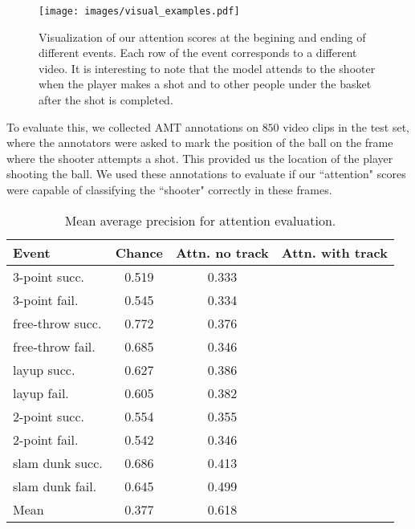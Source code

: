 

\begin{figure*}[t!]
\begin{center}
   \texttt{[image: images/visual\_examples.pdf]}
\end{center}
   \caption{Visualization of our attention scores at the begining and ending of different events.
Each row of the event corresponds to a different video. It is interesting to note that the model
attends to the shooter when the player makes a shot and to other people under the basket after
the shot is completed.}
\label{fig:visual_attention}
\end{figure*}

To evaluate this, 
we collected AMT annotations on $850$ video clips in the test
set, where the annotators were asked to mark the position of the ball
on the frame where the shooter attempts a shot.
This provided us the location of the player shooting the ball.
We used these annotations to evaluate if our ``attention" scores
were capable of classifying the ``shooter" correctly in these frames.

\begin{table}[ht!]
\begin{center}
\small
 \begin{tabular}{|l|c|c|c|}
  \hline
Event            & Chance & Attn. no track & Attn. with track \\ \hline \hline
3-point succ.    & 0.519 & 0.333 & \\ 
3-point fail.    & 0.545 & 0.334 & \\ 
free-throw succ. & 0.772 & 0.376 & \\ 
free-throw fail. & 0.685 & 0.346 & \\  
layup succ.      & 0.627 & 0.386 & \\ 
layup fail.      & 0.605 & 0.382 & \\ 
2-point succ.    & 0.554 & 0.355 & \\ 
2-point fail.    & 0.542 & 0.346 & \\ 
slam dunk succ.  & 0.686 & 0.413 & \\ 
slam dunk fail.  & 0.645 & 0.499 & \\ \hline \hline  
Mean             & 0.377 & 0.618 & \\ \hline
  \end{tabular}
\end{center}
  \caption{Mean average precision for attention evaluation.}
  \label{tab:attention_res}
\end{table}

